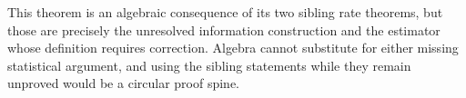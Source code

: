 This theorem is an algebraic consequence of its two sibling rate theorems, but those are precisely the unresolved information construction and the estimator whose definition requires correction.  Algebra cannot substitute for either missing statistical argument, and using the sibling statements while they remain unproved would be a circular proof spine.